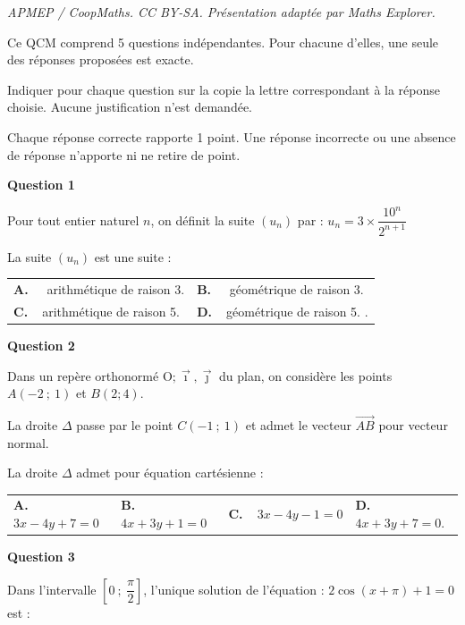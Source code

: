\documentclass[10pt]{article}
\providecommand{\vv}[1]{\overrightarrow{#1}}
\providecommand{\vv}[1]{{\overrightarrow{#1}}}
\providecommand{\Oij}{\(\mathrm{O};\vec{\imath},\vec{\jmath}\)}
\begin{document}
\noindent\textit{APMEP / CoopMaths. CC BY-SA. Présentation adaptée par Maths Explorer.}\par\medskip
\medskip

Ce QCM comprend 5 questions indépendantes. Pour chacune d'elles, une seule des réponses
proposées est exacte.

Indiquer pour chaque question sur la copie la lettre correspondant à la réponse choisie.
Aucune justification n'est demandée.

Chaque réponse correcte rapporte 1 point. Une réponse incorrecte ou une absence de
réponse n'apporte ni ne retire de point.

\medskip

\textbf{Question 1}

\medskip 

Pour tout entier naturel $n$, on définit la suite $\left(u_n\right)$ par : $u_n= 3 \times \dfrac{10^n}{2^{n+1}}$

La suite $\left(u_n\right)$ est une suite :

\begin{tabularx}{\linewidth}{*{2}{X}}
\textbf{A.~~} arithmétique de
raison 3.&\textbf{B.~~} géométrique de
raison 3.\\\textbf{C.~~}arithmétique de
raison 5.& \textbf{D.~~}géométrique de
raison 5. .
\end{tabularx}

\medskip

\textbf{Question 2}

\medskip 

Dans un repère orthonormé \Oij{} du plan, on considère les points $A(-2~;~ 1)$ et $B(2; 4)$.

La droite $\Delta$ passe par le point $C(-1~;~1)$ et admet le vecteur $\vv{AB}$ pour vecteur normal.

La droite $\Delta$ admet pour équation cartésienne :

\medskip

\begin{tabularx}{\linewidth}{*{4}{X}}
\textbf{A.~~} $3x - 4y + 7 = 0$ &\textbf{B.~~} $ 4x + 3y + 1 = 0$&\textbf{C.~~}$ 3x - 4y - 1 = 0$& \textbf{D.~~} $4x + 3y + 7 = 0$.
\end{tabularx}

\medskip

\textbf{Question 3}

\medskip 

Dans l'intervalle $\left[0~;~\dfrac{\pi}{2}\right]$, l'unique solution de l'équation : $2\cos (x + \pi) + 1 = 0$ est :
\end{document}
